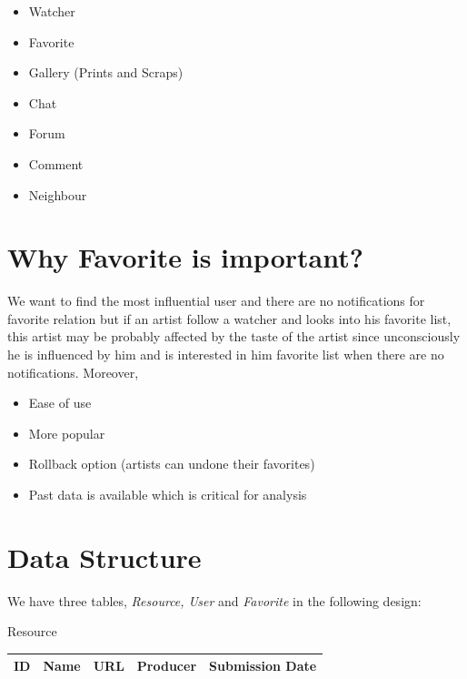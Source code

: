 \documentclass[12pt,a4paper]{report}
\begin{document}
	\begin{itemize}
	\item Watcher
	\item Favorite
	\item Gallery (Prints and Scraps)
	\item Chat
	\item Forum
	\item Comment
	\item Neighbour
	\end{itemize}

	\section{Why Favorite is important?}

	\par \hspace{0.6cm} We want to find the most influential user and there are no notifications for favorite relation but if an artist follow a watcher and looks into his favorite list, this artist may be probably affected by the taste of the artist since unconsciously he is influenced by him and is interested in him favorite list when there are no notifications. Moreover, 

	\begin{itemize}
	\item Ease of use
	\item More popular
	\item Rollback option (artists can undone their favorites)
	\item Past data is available which is critical for analysis
	\end{itemize}

	\clearpage

	\section{Data Structure}

	\par \hspace{0.6cm} We have three tables, \emph{Resource, User} and \emph{Favorite} in the following design:

	\begin{table}[htdp]
	\begin{center}
	\textup{\Large Resource} 
	\begin{tabular}{|p{2cm}|p{2cm}|p{2cm}|p{2cm}|p{4cm}|}
	\hline
	ID & Name & URL & Producer & Submission Date \\
	\hline
	\end{tabular}
	\end{center}
	\end{table} 
\end{document}
